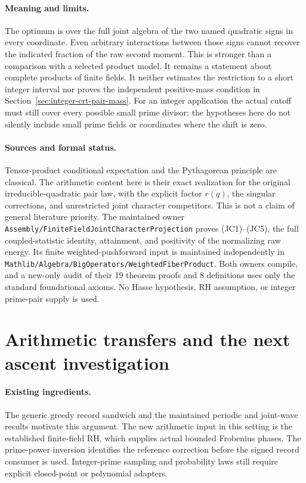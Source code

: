 \documentclass[11pt]{article}
\begin{document}
\paragraph{Meaning and limits.}
The optimum is over the full joint algebra of the two named quadratic
signs in every coordinate. Even arbitrary interactions between those
signs cannot recover the indicated fraction of the raw second moment.
This is stronger than a comparison with a selected product model.
It remains a statement about complete products of finite fields.
It neither estimates the restriction to a short integer interval nor
proves the independent positive-mass condition in
Section~\ref{sec:integer-crt-pair-mass}.
For an integer application the actual cutoff must still cover every
possible small prime divisor; the hypotheses here do not silently include
small prime fields or coordinates where the shift is zero.

\paragraph{Sources and formal status.}
Tensor-product conditional expectation and the Pythagorean principle
are classical. The arithmetic content here is their exact realization
for the original irreducible-quadratic pair law, with the explicit
factor \(r(q)\), the singular corrections, and unrestricted joint
character competitors. This is not a claim of general literature priority.
The maintained owner
\texttt{Assembly/FiniteFieldJointCharacterProjection} proves
(JC1)--(JC5), the full coupled-statistic identity, attainment, and positivity
of the normalizing raw energy. Its finite weighted-pushforward input is
maintained independently in
\texttt{Mathlib/Algebra/BigOperators/WeightedFiberProduct}.
Both owners compile, and a new-only audit of their 19 theorem proofs
and 8 definitions uses only the standard foundational axioms.
No Hasse hypothesis, RH assumption, or integer prime-pair supply is used.

\section{Arithmetic transfers and the next ascent investigation}
\paragraph{Existing ingredients.}
The generic greedy record sandwich and the maintained periodic and
joint-wave results motivate this argument. The new arithmetic input
in this setting is the established finite-field RH, which supplies
actual bounded Frobenius phases. The prime-power inversion identifies
the reference correction before the signed record consumer is used.
Integer-prime sampling and probability laws still require explicit
closed-point or polynomial adapters.
\end{document}
